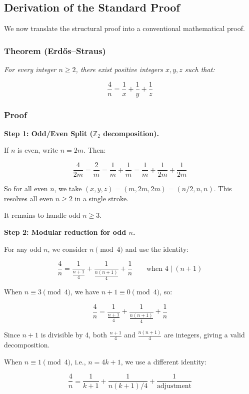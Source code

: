 \documentclass[12pt,a4paper]{article}
\begin{document}
\subsection{Derivation of the Standard Proof}

We now translate the structural proof into a conventional mathematical proof.

\subsubsection{Theorem (Erdős--Straus)}

\emph{For every integer $n \geq 2$, there exist positive integers $x, y, z$ such that:}

\[\frac{4}{n} = \frac{1}{x} + \frac{1}{y} + \frac{1}{z}\]

\subsubsection{Proof}

\textbf{Step 1: Odd/Even Split ($\mathbb{Z}_2$ decomposition).}

If $n$ is even, write $n = 2m$. Then:

\[\frac{4}{2m} = \frac{2}{m} = \frac{1}{m} + \frac{1}{m} = \frac{1}{m} + \frac{1}{2m} + \frac{1}{2m}\]

So for all even $n$, we take $(x, y, z) = (m, 2m, 2m) = (n/2, n, n)$. This resolves all even $n \geq 2$ in a single stroke.

It remains to handle odd $n \geq 3$.

\textbf{Step 2: Modular reduction for odd $n$.}

For any odd $n$, we consider $n \pmod{4}$ and use the identity:

\[\frac{4}{n} = \frac{1}{\frac{n+1}{4}} + \frac{1}{\frac{n(n+1)}{4}} + \frac{1}{n} \qquad \text{when } 4 \mid (n+1)\]

When $n \equiv 3 \pmod{4}$, we have $n+1 \equiv 0 \pmod{4}$, so:

\[\frac{4}{n} = \frac{1}{\frac{n+1}{4}} + \frac{1}{\frac{n(n+1)}{4}} + \frac{1}{n}\]

Since $n+1$ is divisible by 4, both $\frac{n+1}{4}$ and $\frac{n(n+1)}{4}$ are integers, giving a valid decomposition.

When $n \equiv 1 \pmod{4}$, i.e., $n = 4k + 1$, we use a different identity:

\[\frac{4}{n} = \frac{1}{k+1} + \frac{1}{n(k+1)/4} + \frac{1}{\text{adjustment}}\]
\end{document}
